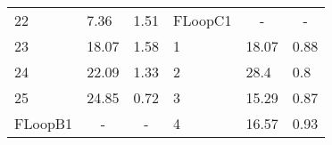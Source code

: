 \documentclass[oneside,onecolumn]{article}
\begin{document}
\begin{table}[]
\begin{tabular}{llllll}
22                                                                                  & 7.36                                                                                                    & 1.51                                                                                   & \multicolumn{1}{c}{FLoopC1}                                                          & \multicolumn{1}{c}{-}                                                                                   & \multicolumn{1}{c}{-}                                                                  \\
23                                                                                  & 18.07                                                                                                   & 1.58                                                                                   & 1                                                                                    & 18.07                                                                                                   & 0.88                                                                                   \\
24                                                                                  & 22.09                                                                                                   & 1.33                                                                                   & 2                                                                                    & 28.4                                                                                                    & 0.8                                                                                    \\
25                                                                                  & 24.85                                                                                                   & 0.72                                                                                   & 3                                                                                    & 15.29                                                                                                   & 0.87                                                                                   \\
\multicolumn{1}{c}{FLoopB1}                                                         & \multicolumn{1}{c}{-}                                                                                   & \multicolumn{1}{c}{-}                                                                  & 4                                                                                    & 16.57                                                                                                   & 0.93                                                                                   \\

\end{tabular}
\end{table}
\end{document}

